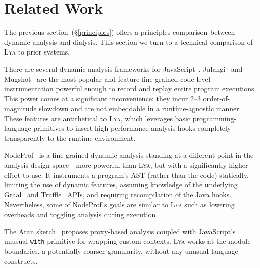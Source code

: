 \documentclass[letterpaper,twocolumn,10pt]{article}
\newcommand{\heading}[1]{\vspace{2pt}\noindent\textbf{#1}\enspace}
\newcommand{\ttt}[1]{\texttt{#1}}
\newcommand{\sx}[1]{(\S\ref{#1})}
\newcommand{\sys}{{\scshape Lya}\xspace}
\begin{document}
\section{Related Work}
\label{rw}

The previous section~\sx{principles} offers a principles-comparison between dynamic analysis and dialysis.
This section we turn to a technical comparison of \sys to prior systems.

There are several dynamic analysis frameworks for JavaScript~\cite{javascript1, javascript2, javascript3, mugshot, jalangi}.
Jalangi~\cite{jalangi} and Mugshot~\cite{mugshot} are the most popular and feature fine-grained code-level instrumentation powerful enough to record and replay entire program executions.
This power comes at a significant inconvenience: %
  they incur 2--3 order-of-magnitude slowdown and are not embeddable in a runtime-agnostic manner.
These features are antithetical to \sys, which leverages basic programming-language primitives to insert high-performance analysis hooks completely transparently to the runtime environment.

NodeProf~\cite{javascript3} is a fine-grained dynamic analysis %
  standing at a different point in the analysis design space---more powerful than \sys, but with a significantly higher effort to use.
It instruments a program's AST (rather than the code) statically, %
  limiting the use of dynamic features, assuming knowledge of the underlying Graal~\cite{graal} and Truffle~\cite{truffle} APIs, and requiring recompilation of the Java hooks.
Nevertheless, some of NodeProf's goals are similar to \sys such as lowering overheads and toggling analysis during execution.

The Aran sketch~\cite{javascript1} proposes proxy-based analysis coupled with JavaScript's unusual \ttt{with} primitive for wrapping custom contexts.
\sys works at the module boundaries, a potentially coarser granularity, without any unusual language constructs.
\end{document}

